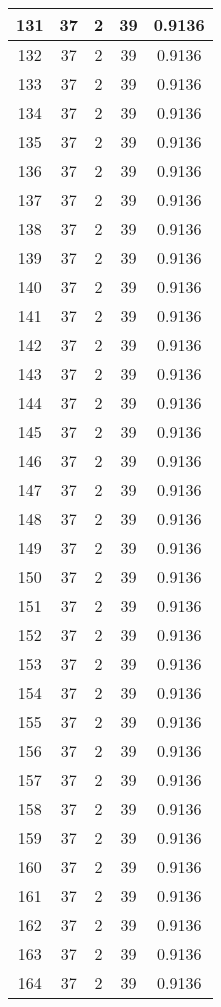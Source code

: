 \documentclass[letterpaper, 12pt]{article}
\begin{document}
\begin{longtable}{|c|c|c|c|c|}
\hline
131 & 37 & 2 & 39 & 0.9136 \\
\hline
132 & 37 & 2 & 39 & 0.9136 \\
\hline
133 & 37 & 2 & 39 & 0.9136 \\
\hline
134 & 37 & 2 & 39 & 0.9136 \\
\hline
135 & 37 & 2 & 39 & 0.9136 \\
\hline
136 & 37 & 2 & 39 & 0.9136 \\
\hline
137 & 37 & 2 & 39 & 0.9136 \\
\hline
138 & 37 & 2 & 39 & 0.9136 \\
\hline
139 & 37 & 2 & 39 & 0.9136 \\
\hline
140 & 37 & 2 & 39 & 0.9136 \\
\hline
141 & 37 & 2 & 39 & 0.9136 \\
\hline
142 & 37 & 2 & 39 & 0.9136 \\
\hline
143 & 37 & 2 & 39 & 0.9136 \\
\hline
144 & 37 & 2 & 39 & 0.9136 \\
\hline
145 & 37 & 2 & 39 & 0.9136 \\
\hline
146 & 37 & 2 & 39 & 0.9136 \\
\hline
147 & 37 & 2 & 39 & 0.9136 \\
\hline
148 & 37 & 2 & 39 & 0.9136 \\
\hline
149 & 37 & 2 & 39 & 0.9136 \\
\hline
150 & 37 & 2 & 39 & 0.9136 \\
\hline
151 & 37 & 2 & 39 & 0.9136 \\
\hline
152 & 37 & 2 & 39 & 0.9136 \\
\hline
153 & 37 & 2 & 39 & 0.9136 \\
\hline
154 & 37 & 2 & 39 & 0.9136 \\
\hline
155 & 37 & 2 & 39 & 0.9136 \\
\hline
156 & 37 & 2 & 39 & 0.9136 \\
\hline
157 & 37 & 2 & 39 & 0.9136 \\
\hline
158 & 37 & 2 & 39 & 0.9136 \\
\hline
159 & 37 & 2 & 39 & 0.9136 \\
\hline
160 & 37 & 2 & 39 & 0.9136 \\
\hline
161 & 37 & 2 & 39 & 0.9136 \\
\hline
162 & 37 & 2 & 39 & 0.9136 \\
\hline
163 & 37 & 2 & 39 & 0.9136 \\
\hline
164 & 37 & 2 & 39 & 0.9136 \\

\end{longtable}
\end{document}
